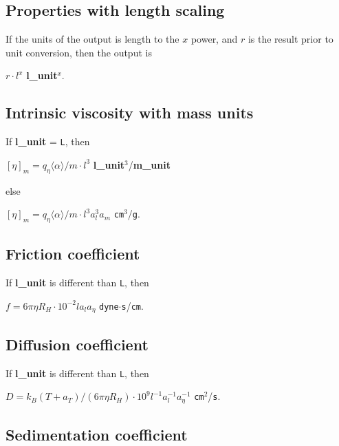 \documentclass[12pt,letterpaper]{article}
\begin{document}
\subsection{Properties with length scaling}

If the units of the output is length to the $x$ power, and $r$ is the result prior to unit conversion, then the output is
\begin{center}
$r \cdot l^x$ \textbf{l\_unit}$^x$.
\end{center}

\subsection{Intrinsic viscosity with mass units}

If \textbf{l\_unit} = \texttt{L}, then
\begin{center}
$[\eta]_{m}=q_\eta \langle\alpha\rangle/m \cdot l^3$ \textbf{l\_unit}$^3$/\textbf{m\_unit}
\end{center}
else
\begin{center}
$[\eta]_{m}=q_\eta \langle\alpha\rangle/m \cdot l^3 a_{l}^3 a_{m}$ \texttt{cm}$^3$/\texttt{g}.
\end{center} 


\subsection{Friction coefficient}

If \textbf{l\_unit} is different than \texttt{L}, then \\
\begin{center}
$f = 6\pi\eta R_H \cdot 10^{-2} l a_l a_\eta $ \texttt{dyne}$\cdot$\texttt{s}/\texttt{cm}.
\end{center} 

\subsection{Diffusion coefficient}

If \textbf{l\_unit} is different than \texttt{L}, then \\
\begin{center}
$D = k_{B}(T + a_T)/(6\pi\eta R_H) \cdot 10^{9} l^{-1} a_l^{-1} a_\eta^{-1} $ \texttt{cm}$^2$/\texttt{s}.
\end{center} 

\subsection{Sedimentation coefficient}
\end{document}
